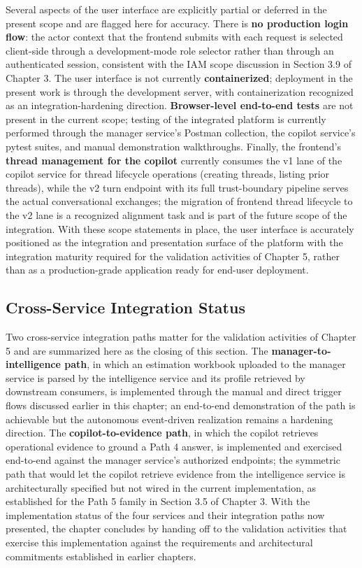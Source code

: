 Several aspects of the user interface are explicitly partial or deferred in the present scope and are flagged here for accuracy. There is \textbf{no production login flow}: the actor context that the frontend submits with each request is selected client-side through a development-mode role selector rather than through an authenticated session, consistent with the IAM scope discussion in Section 3.9 of Chapter 3. The user interface is not currently \textbf{containerized}; deployment in the present work is through the development server, with containerization recognized as an integration-hardening direction. \textbf{Browser-level end-to-end tests} are not present in the current scope; testing of the integrated platform is currently performed through the manager service's Postman collection, the copilot service's pytest suites, and manual demonstration walkthroughs. Finally, the frontend's \textbf{thread management for the copilot} currently consumes the v1 lane of the copilot service for thread lifecycle operations (creating threads, listing prior threads), while the v2 turn endpoint with its full trust-boundary pipeline serves the actual conversational exchanges; the migration of frontend thread lifecycle to the v2 lane is a recognized alignment task and is part of the future scope of the integration. With these scope statements in place, the user interface is accurately positioned as the integration and presentation surface of the platform with the integration maturity required for the validation activities of Chapter 5, rather than as a production-grade application ready for end-user deployment.

\subsection*{Cross-Service Integration Status}
Two cross-service integration paths matter for the validation activities of Chapter 5 and are summarized here as the closing of this section. The \textbf{manager-to-intelligence path}, in which an estimation workbook uploaded to the manager service is parsed by the intelligence service and its profile retrieved by downstream consumers, is implemented through the manual and direct trigger flows discussed earlier in this chapter; an end-to-end demonstration of the path is achievable but the autonomous event-driven realization remains a hardening direction. The \textbf{copilot-to-evidence path}, in which the copilot retrieves operational evidence to ground a Path 4 answer, is implemented and exercised end-to-end against the manager service's authorized endpoints; the symmetric path that would let the copilot retrieve evidence from the intelligence service is architecturally specified but not wired in the current implementation, as established for the Path 5 family in Section 3.5 of Chapter 3. With the implementation status of the four services and their integration paths now presented, the chapter concludes by handing off to the validation activities that exercise this implementation against the requirements and architectural commitments established in earlier chapters.

